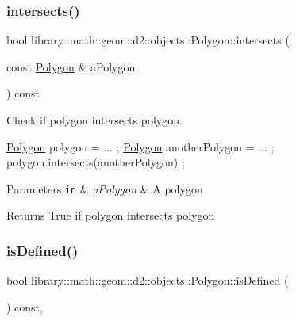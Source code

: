 \subsubsection{\texorpdfstring{intersects()}{intersects()}}
{\footnotesize\ttfamily bool library\+::math\+::geom\+::d2\+::objects\+::\+Polygon\+::intersects (\begin{DoxyParamCaption}\item[{const \hyperlink{classlibrary_1_1math_1_1geom_1_1d2_1_1objects_1_1_polygon}{Polygon} \&}]{a\+Polygon }\end{DoxyParamCaption}) const}



Check if polygon intersects polygon. 


\begin{DoxyCode}
\hyperlink{classlibrary_1_1math_1_1geom_1_1d2_1_1objects_1_1_polygon_ad2a0b0bcd5301dbcd9e2fa101fbd220b}{Polygon} polygon = ... ;
\hyperlink{classlibrary_1_1math_1_1geom_1_1d2_1_1objects_1_1_polygon_ad2a0b0bcd5301dbcd9e2fa101fbd220b}{Polygon} anotherPolygon = ... ;
polygon.intersects(anotherPolygon) ;
\end{DoxyCode}



\begin{DoxyParams}[1]{Parameters}
\mbox{\tt in}  & {\em a\+Polygon} & A polygon \\
\hline
\end{DoxyParams}
\begin{DoxyReturn}{Returns}
True if polygon intersects polygon 
\end{DoxyReturn}
\mbox{\label{classlibrary_1_1math_1_1geom_1_1d2_1_1objects_1_1_polygon_a83e0962f91f0732048e156ad634faaea}} 
\subsubsection{\texorpdfstring{is\+Defined()}{isDefined()}}
{\footnotesize\ttfamily bool library\+::math\+::geom\+::d2\+::objects\+::\+Polygon\+::is\+Defined (\begin{DoxyParamCaption}{ }\end{DoxyParamCaption}) const\hspace{0.3cm}{\ttfamily [override]}, {\ttfamily [virtual]}}



